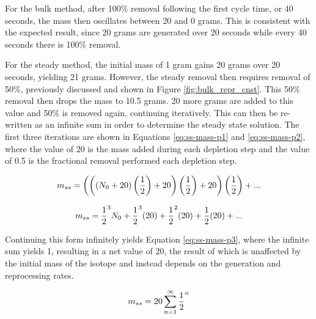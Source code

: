 For the bulk method, after 100\% removal following the first cycle time, or 40 seconds, the mass then oscillates between 20 and 0 grams. 
This is consistent with the expected result, since 20 grams are generated over 20 seconds while every 40 seconds there is 100\% removal. 

For the steady method, the initial mass of 1 gram gains 20 grams over 20 seconds, yielding 21 grams. However, the steady removal then requires removal of 50\%, previously discussed and shown in Figure \ref{fig:bulk_repr_cnst}. This 50\% removal then drops the mass to 10.5 grams. 20 more grams are added to this value and 50\% is removed again, continuing iteratively. This can then be re-written as an infinite sum in order to determine the steady state solution. The first three iterations are shown in Equations \eqref{eq:ss-mass-p1} and \eqref{eq:ss-mass-p2}, where the value of 20 is the mass added during each depletion step and the value of 0.5 is the fractional removal performed each depletion step. 


\begin{equation} \hfill 
m_{ss} = \left( \left( \left(N_0+20 \right) \left(\frac{1}{2} \right)+20 \right)\left(\frac{1}{2} \right)+20 \right)\left(\frac{1}{2} \right) + ...
\hfill\label{eq:ss-mass-p1} \end{equation}

\begin{equation} \hfill 
m_{ss} = \frac{1}{2}^3 N_0 + \frac{1}{2}^3 (20) + \frac{1}{2}^2 (20) + \frac{1}{2} (20) + ...
\hfill\label{eq:ss-mass-p2} \end{equation}

Continuing this form infinitely yields Equation \eqref{eq:ss-mass-p3}, where the infinite sum yields 1, resulting in a net value of 20, the result of which is unaffected by the initial mass of the isotope and instead depends on the generation and reprocessing rates.

\begin{equation} \hfill 
m_{ss} = 20 \sum_{n=1}^\infty \frac{1}{2}^n 
\hfill\label{eq:ss-mass-p3} \end{equation}

